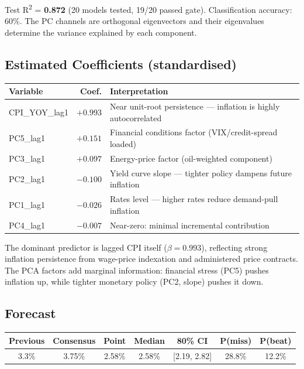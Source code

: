 \documentclass[11pt,a4paper]{article}
\begin{document}
Test R\textsuperscript{2} = \textbf{0.872} (20 models tested, 19/20 passed gate). Classification accuracy: 60\%. The PC channels are orthogonal eigenvectors and their eigenvalues determine the variance explained by each component.

\subsection*{Estimated Coefficients (standardised)}
\begin{table}[H]
\centering\small
\begin{tabular}{lrl}
\toprule
\textbf{Variable} & \textbf{Coef.} & \textbf{Interpretation} \\
\midrule
CPI\_YOY\_lag1 & $+0.993$ & Near unit-root persistence --- inflation is highly autocorrelated \\
PC5\_lag1 & $+0.151$ & Financial conditions factor (VIX/credit-spread loaded) \\
PC3\_lag1 & $+0.097$ & Energy-price factor (oil-weighted component) \\
PC2\_lag1 & $-0.100$ & Yield curve slope --- tighter policy dampens future inflation \\
PC1\_lag1 & $-0.026$ & Rates level --- higher rates reduce demand-pull inflation \\
PC4\_lag1 & $-0.007$ & Near-zero: minimal incremental contribution \\
\bottomrule
\end{tabular}
\end{table}

\noindent The dominant predictor is lagged CPI itself ($\beta = 0.993$), reflecting strong inflation persistence from wage-price indexation and administered price contracts. The PCA factors add marginal information: financial stress (PC5) pushes inflation up, while tighter monetary policy (PC2, slope) pushes it down.

\subsection*{Forecast}
\begin{table}[H]
\centering\small
\begin{tabular}{ccccccc}
\toprule
\textbf{Previous} & \textbf{Consensus} & \textbf{Point} & \textbf{Median} & \textbf{80\% CI} & \textbf{P(miss)}  & \textbf{P(beat)} \\
\midrule
3.3\% & 3.75\% & 2.58\% & 2.58\% & [2.19, 2.82] & 28.8\% & 12.2\% \\
\bottomrule
\end{tabular}
\end{table}
\end{document}

